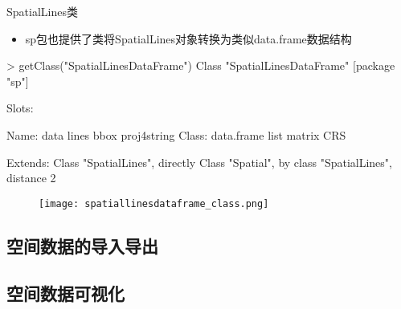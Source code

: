 \begin{frame}[t,fragile]{\subsecname}{SpatialLines类}
\begin{itemize}
\item<1-> sp包也提供了类将SpatialLines对象转换为类似data.frame数据结构
\end{itemize}

\begin{rcode}
> getClass("SpatialLinesDataFrame")
Class "SpatialLinesDataFrame" [package "sp"]

Slots:
                                                      
Name:         data       lines        bbox proj4string
Class:  data.frame        list      matrix         CRS

Extends: 
Class "SpatialLines", directly
Class "Spatial", by class "SpatialLines", distance 2
\end{rcode}
\begin{figure}[ht]
  \texttt{[image: spatiallinesdataframe\_class.png]}
\end{figure}
\end{frame}
\subsection{空间数据的导入导出}

\subsection{空间数据可视化}